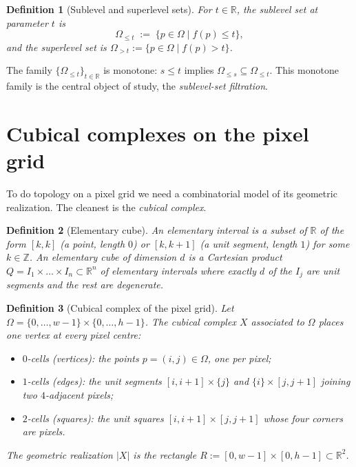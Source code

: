 \documentclass[11pt]{article}
\theoremstyle{persdef}
\newtheorem{definition}{Definition}[section]
\newcommand{\R}{\mathbb{R}}
\newcommand{\Z}{\mathbb{Z}}
\newcommand{\X}{X}
\newcommand{\sublevL}[2]{#1_{\leq #2}}
\newcommand{\sublevG}[2]{#1_{> #2}}
\begin{document}
\begin{definition}[Sublevel and superlevel sets]\label{def:sublev}
For $t\in\R$, the \emph{sublevel set} at parameter $t$ is
\[
\sublevL{\Omega}{t} \;:=\; \{p\in\Omega \mid f(p)\leq t\},
\]
and the \emph{superlevel set} is $\sublevG{\Omega}{t} := \{p\in\Omega \mid f(p) > t\}$.
\end{definition}

\noindent
The family $\{\sublevL{\Omega}{t}\}_{t\in\R}$ is monotone: $s\leq t$ implies $\sublevL{\Omega}{s}\subseteq\sublevL{\Omega}{t}$. This monotone family is the central object of study, the \emph{sublevel-set filtration}.

\section{Cubical complexes on the pixel grid}

To do topology on a pixel grid we need a combinatorial model of its geometric realization. The cleanest is the \emph{cubical complex}.

\begin{definition}[Elementary cube]\label{def:elemcube}
An \emph{elementary interval} is a subset of $\R$ of the form $[k,k]$ (a point, length $0$) or $[k,k{+}1]$ (a unit segment, length $1$) for some $k\in\Z$. An \emph{elementary cube} of dimension $d$ is a Cartesian product $Q = I_1\times\dots\times I_n\subset\R^n$ of elementary intervals where exactly $d$ of the $I_j$ are unit segments and the rest are degenerate.
\end{definition}

\begin{definition}[Cubical complex of the pixel grid]\label{def:cubcomp}
Let $\Omega = \{0,\dots,w{-}1\}\times\{0,\dots,h{-}1\}$. The cubical complex $\X$ associated to $\Omega$ places one vertex at every pixel centre:
\begin{itemize}[leftmargin=2em,itemsep=0.2em]
  \item \emph{$0$-cells (vertices):} the points $p=(i,j)\in\Omega$, one per pixel;
  \item \emph{$1$-cells (edges):} the unit segments $[i,i{+}1]\times\{j\}$ and $\{i\}\times[j,j{+}1]$ joining two $4$-adjacent pixels;
  \item \emph{$2$-cells (squares):} the unit squares $[i,i{+}1]\times[j,j{+}1]$ whose four corners are pixels.
\end{itemize}
The geometric realization $|\X|$ is the rectangle $R:=[0,w{-}1]\times[0,h{-}1]\subset\R^2$.
\end{definition}
\end{document}
